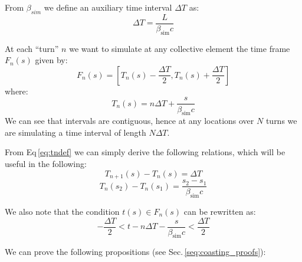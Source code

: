From $\beta_{sim}$ we define an auxiliary time interval $\Delta T$ as:
\begin{equation}
\Delta T = \frac{L}{\beta_\text{sim}c}
\label{eq:deltatdef}
\end{equation}


At each ``turn'' $n$ we want to simulate at any  collective element the time frame $F_n(s) $ given by:
\begin{equation}
F_n(s) = \left[ T_n(s) - \frac{\Delta T}{2}, T_n(s) + \frac{\Delta T}{2} \right]
\label{eq:framedef}
\end{equation}
where:
\begin{equation}
T_n(s) = n \Delta T + \frac{s}{\beta_\text{sim} c}
\label{eq:tndef}
\end{equation}
We can see that intervals are contiguous, hence at any locations over $N$ turns we are simulating a time interval of length $N \Delta T$.

From Eq\,\ref{eq:tndef} we can simply derive the following  relations, which will be useful in the following:
\begin{equation}
T_{n+1}(s) - T_{n}(s)  = \Delta T
\label{eq:tniter}
\end{equation}
\begin{equation}
T_{n}(s_2) - T_{n}(s_1)  = \frac{s_2 - s_1}{\beta_\text{sim} c}
\label{eq:frametransport}
\end{equation}

We also note that the condition $t(s) \in F_n(s)$ can be rewritten as:
\begin{equation}
- \frac{\Delta T}{2} < t - n \Delta T - \frac{s}{\beta_\text{sim} c} < \frac{\Delta T}{2}
\label{eq:frameineq}
\end{equation}


We can prove the following propositions (see Sec.\,\ref{seq:coasting_proofs}):

